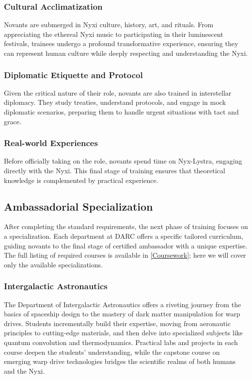 \subsubsection{Cultural Acclimatization}
Novants are submerged in Nyxi culture, history, art, and rituals. From
appreciating the ethereal Nyxi music to participating in their luminescent
festivals, trainees undergo a profound transformative experience, ensuring they
can represent human culture while deeply respecting and understanding the Nyxi.

\subsubsection{Diplomatic Etiquette and Protocol}
Given the critical nature of their role, novants are also trained in
interstellar diplomacy. They study treaties, understand protocols, and engage
in mock diplomatic scenarios, preparing them to handle urgent situations with
tact and grace.

\subsubsection{Real-world Experiences}
Before officially taking on the role, novants spend time on Nyx-Lystra,
engaging directly with the Nyxi. This final stage of training ensures that
theoretical knowledge is complemented by practical experience.

\subsection{Ambassadorial Specialization}
After completing the standard requirements, the next phase of training focuses
on a specialization. Each department at DARC offers a specific tailored
curriculum, guiding novants to the final stage of certified ambassador with a
unique expertise. The full listing of required courses is available in
\ref{Coursework}; here we will cover only the available specializations.

\begin{center}
\end{center}

\subsubsection{Intergalactic Astronautics}
The Department of Intergalactic Astronautics offers a riveting journey from the
basics of spaceship design to the mastery of dark matter manipulation for warp
drives. Students incrementally build their expertise, moving from aeronautic
principles to cutting-edge materials, and then delve into specialized subjects
like quantum convolution and thermodynamics. Practical labs and projects in
each course deepen the students' understanding, while the capstone course on
emerging warp drive technologies bridges the scientific realms of both humans
and the Nyxi.

